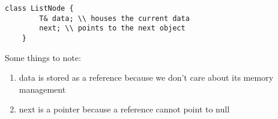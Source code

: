 \documentclass{article}
\newtheorem{one minute paper}[theorem]{One Minute Paper}
\begin{document}
\begin{lstlisting}[caption=Example Linked List Single Object]
    class ListNode {
        T& data; \\ houses the current data
        next; \\ points to the next object
    }
\end{lstlisting}

Some things to note:
\begin{enumerate}
    \item data is stored as a reference because we don't care about its memory management
    \item next is a pointer because a reference cannot point to null
\end{enumerate}
\end{document}
